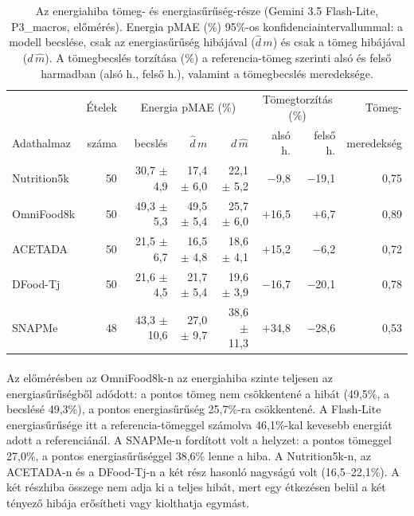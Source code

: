 \begin{table}[h]
\centering
\caption{Az energiahiba tömeg- és energiasűrűség-része (Gemini 3.5 Flash-Lite, P3\_macros, 
előmérés). Energia pMAE (\%) 95\%-os konfidenciaintervallummal: a modell becslése, csak az 
energiasűrűség hibájával ($\hat d\,m$) és csak a tömeg hibájával ($d\,\hat m$). A 
tömegbecslés torzítása (\%) a referencia-tömeg szerinti alsó és felső harmadban (alsó h., 
felső h.), valamint a tömegbecslés meredeksége.}
\label{tab:hibaforrasok}
\small
\setlength{\tabcolsep}{4pt}
\begin{tabular}{lrrrrrrr}
\hline
 & Ételek & \multicolumn{3}{c}{Energia pMAE (\%)} & \multicolumn{2}{c}{Tömegtorzítás (\%)} & Tömeg- \\
Adathalmaz & száma & becslés & $\hat d\,m$ & $d\,\hat m$ & alsó h. & felső h. & meredekség \\
\hline
Nutrition5k & 50 & 30{,}7 $\pm$ 4{,}9 & 17{,}4 $\pm$ 6{,}0 & 22{,}1 $\pm$ 5{,}2 & $-$9{,}8 & $-$19{,}1 & 0{,}75 \\
OmniFood8k & 50 & 49{,}3 $\pm$ 5{,}3 & 49{,}5 $\pm$ 5{,}4 & 25{,}7 $\pm$ 6{,}0 & $+$16{,}5 & $+$6{,}7 & 0{,}89 \\
ACETADA & 50 & 21{,}5 $\pm$ 6{,}7 & 16{,}5 $\pm$ 4{,}8 & 18{,}6 $\pm$ 4{,}1 & $+$15{,}2 & $-$6{,}2 & 0{,}72 \\
DFood-Tj & 50 & 21{,}6 $\pm$ 4{,}5 & 21{,}7 $\pm$ 5{,}4 & 19{,}6 $\pm$ 3{,}9 & $-$16{,}7 & $-$20{,}1 & 0{,}78 \\
SNAPMe & 48 & 43{,}3 $\pm$ 10{,}6 & 27{,}0 $\pm$ 9{,}7 & 38{,}6 $\pm$ 11{,}3 & $+$34{,}8 & $-$28{,}6 & 0{,}53 \\
\hline
\end{tabular}
\end{table}

\paragraph{}Az előmérésben az OmniFood8k-n az energiahiba szinte teljesen az energiasűrűségből 
adódott: a 
pontos tömeg nem csökkentené a hibát (49,5\%, a becslésé 49,3\%), a pontos energiasűrűség 
25,7\%-ra csökkentené. A Flash-Lite energiasűrűsége itt a referencia-tömeggel számolva 
46,1\%-kal kevesebb energiát adott a referenciánál. A SNAPMe-n fordított volt a helyzet: a pontos 
tömeggel 27,0\%, a pontos energiasűrűséggel 38,6\% lenne a hiba. A Nutrition5k-n, az 
ACETADA-n és a DFood-Tj-n a két rész hasonló nagyságú volt (16,5--22,1\%). A két részhiba 
összege nem adja ki a teljes hibát, mert egy étkezésen belül a két tényező hibája 
erősítheti vagy kiolthatja egymást.

